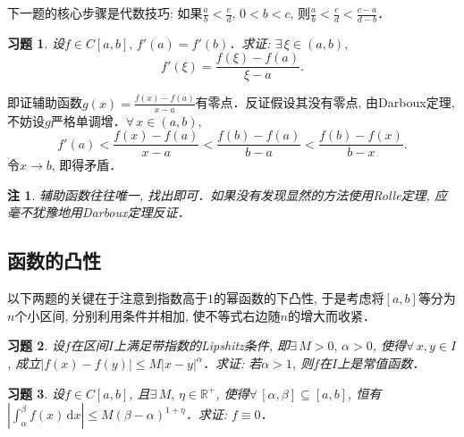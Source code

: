 \documentclass[11pt,a4paper]{ctexart}
\makeatletter
\theoremstyle{thmseries} %
\theoremstyle{exerseries}
\newtheorem{exer}{习题}[section]
\newtheorem*{rem}{注}
\renewenvironment{proof}[1][\proofname]{\par
  \pushQED{\qed}%
  \normalfont \topsep6\p@\@plus6\p@\relax
  \trivlist
  \item[\hskip\labelsep
        \itshape
    #1\@addpunct{}]\ignorespaces
}{%
  \popQED\endtrivlist\@endpefalse
}
\newenvironment{pf}{\begin{proof}[\bfseries\upshape 证\quad]}{\end{proof}}
\newcommand{\R}{\mathbb{R}}
\newcommand{\N}{\mathbb{N}}
\renewcommand{\d}{\mathrm{d}}
\def \nti {\mathnormal{n}\to\infty}
\makeatother
\begin{document}
下一题的核心步骤是代数技巧: 如果$\frac{a}{b}<\frac{c}{d},\,0<b<c$, 则$\frac{a}{b}<\frac{c}{d}<\frac{c-a}{d-b}$．
\begin{exer}
	设$f\in C[a,b],\,f'(a)=f'(b)$．求证: $\exists\,\xi\in(a,b),$
	\[f'(\xi)=\frac{f(\xi)-f(a)}{\xi-a}.\]
\end{exer}
\begin{pf}
	即证辅助函数$g(x)=\frac{f(x)-f(a)}{x-a}$有零点．反证假设其没有零点, 由Darboux定理, 不妨设$g$严格单调增．$\forall\,x\in(a,b),$
	\[f'(a)<\frac{f(x)-f(a)}{x-a}<\frac{f(b)-f(a)}{b-a}<\frac{f(b)-f(x)}{b-x}.\]
	令$x\to b$, 即得矛盾．
\end{pf}
\begin{rem}
	辅助函数往往唯一, 找出即可．如果没有发现显然的方法使用Rolle定理, 应毫不犹豫地用Darboux定理反证．
\end{rem}




\subsection{函数的凸性}
以下两题的关键在于注意到指数高于$1$的幂函数的下凸性, 于是考虑将$[a,b]$等分为$n$个小区间, 分别利用条件并相加, 使不等式右边随$n$的增大而收紧．
\begin{exer}
	设$f$在区间$I$上满足带指数的Lipshitz条件, 即$\exists\,M>0,\,\alpha>0$, 使得$\forall\,x,y\in I$, 成立$|f(x)-f(y)|\leq M|x-y|^\alpha$．求证: 若$\alpha>1$, 则$f$在$I$上是常值函数．
\end{exer}

\begin{exer}
	设$f\in C[a,b]$, 且$\exists\,M,\,\eta\in\R^+$, 使得$\forall\,[\alpha,\beta]\subseteq[a,b]$, 恒有$\left|\int_{\alpha}^{\beta}f(x)\,\d x\right|\leq M(\beta-\alpha)^{1+\eta}$．求证: $f\equiv0$．
\end{exer}
\end{document}
